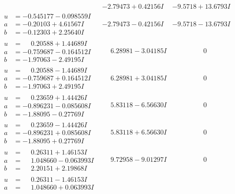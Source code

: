 \documentclass[1p]{elsarticle_modified}
\theoremstyle{definition}
\begin{document}
$$\begin{array}{c|c|c}
 & -2.79473 + 0.42156 I & -9.5718 + 13.6793 I \\ \hline\begin{aligned}
u &= -0.545177 - 0.098559 I \\
a &= -0.20103 + 4.61567 I \\
b &= -0.12303 + 2.25640 I\end{aligned}
 & -2.79473 - 0.42156 I & -9.5718 - 13.6793 I \\ \hline\begin{aligned}
u &= \phantom{-}0.20588 + 1.44689 I \\
a &= -0.759687 - 0.164512 I \\
b &= -1.97063 - 2.49195 I\end{aligned}
 & \phantom{-}6.28981 - 3.04185 I & \phantom{-0.000000 } 0 \\ \hline\begin{aligned}
u &= \phantom{-}0.20588 - 1.44689 I \\
a &= -0.759687 + 0.164512 I \\
b &= -1.97063 + 2.49195 I\end{aligned}
 & \phantom{-}6.28981 + 3.04185 I & \phantom{-0.000000 } 0 \\ \hline\begin{aligned}
u &= \phantom{-}0.23659 + 1.44426 I \\
a &= -0.896231 - 0.085608 I \\
b &= -1.88095 - 0.27769 I\end{aligned}
 & \phantom{-}5.83118 - 6.56630 I & \phantom{-0.000000 } 0 \\ \hline\begin{aligned}
u &= \phantom{-}0.23659 - 1.44426 I \\
a &= -0.896231 + 0.085608 I \\
b &= -1.88095 + 0.27769 I\end{aligned}
 & \phantom{-}5.83118 + 6.56630 I & \phantom{-0.000000 } 0 \\ \hline\begin{aligned}
u &= \phantom{-}0.26311 + 1.46153 I \\
a &= \phantom{-}1.048660 - 0.063993 I \\
b &= \phantom{-}2.20151 + 2.19868 I\end{aligned}
 & \phantom{-}9.72958 - 9.01297 I & \phantom{-0.000000 } 0 \\ \hline\begin{aligned}
u &= \phantom{-}0.26311 - 1.46153 I \\
a &= \phantom{-}1.048660 + 0.063993 I \\

\end{aligned}
\end{array}$$
\end{document}
